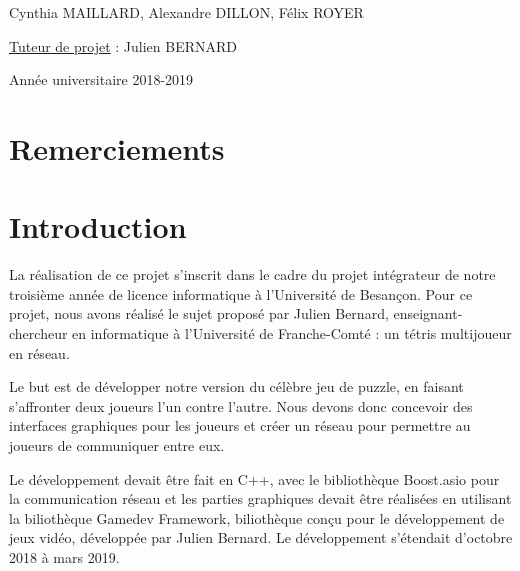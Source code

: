 \documentclass[a4paper, 12pt]{article}
\begin{document}
\begin{titlepage}
\begin{sffamily}
\begin{center}
    \vspace{1cm}

    \Large{Cynthia MAILLARD, Alexandre DILLON, Félix ROYER} \\

    \vspace{0.25cm}

    \Large{\underline{Tuteur de projet} : Julien BERNARD}
    
    \vspace{0.5cm}

    {\large Année universitaire 2018-2019}

    \end{center}
    \end{sffamily}
    \thispagestyle{empty}%


\end{titlepage}

\newpage

\tableofcontents

\newpage

\section*{Remerciements}
	
\section*{Introduction}
	La réalisation de ce projet s'inscrit dans le cadre du projet intégrateur de notre troisième année de licence informatique à l'Université de Besançon. Pour ce projet, nous avons réalisé le sujet proposé par Julien Bernard, enseignant-chercheur en informatique à l'Université de Franche-Comté : un tétris multijoueur en réseau.

	\bigskip

	Le but est de développer notre version du célèbre jeu de puzzle, en faisant s'affronter deux joueurs l'un contre l'autre. Nous devons donc concevoir des interfaces graphiques pour les joueurs et créer un réseau pour permettre au joueurs de communiquer entre eux.

	\bigskip

	Le développement devait être fait en C++, avec le bibliothèque Boost.asio pour la communication réseau et les parties graphiques devait être réalisées en utilisant la biliothèque Gamedev Framework, biliothèque conçu pour le développement de jeux vidéo, développée par Julien Bernard.
	Le développement s'étendait d'octobre 2018 à mars 2019.
\end{document}
